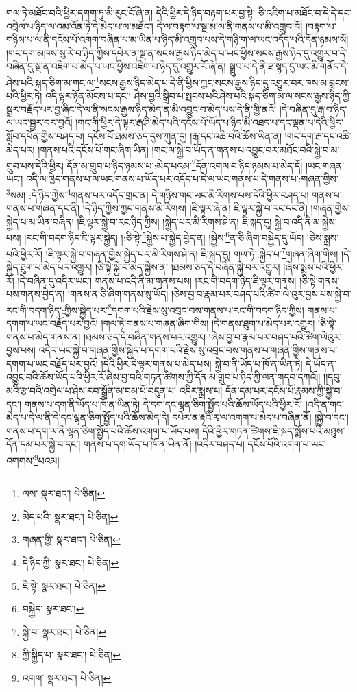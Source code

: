 གལ་ཏེ་མཐོང་བའི་ཕྱིར་དགག་ཏུ་མི་རུང་ངོ་ཞེ་ན། དེའི་ཕྱིར་དེ་ཉིད་བརྟག་པར་བྱ་སྟེ། ཅི་འཇིག་པ་མཐོང་བ་དེ་དེ་དང་འབྲེལ་པ་ཉིད་ལ་འམ་འོན་ཏེ་དེ་མེད་པ་ལ་མཐོང་། དེ་ལ་བརྟག་པ་སྔ་མ་ལ་ནི་གནས་པ་མི་འགྲུབ་བོ། །བརྟག་པ་གཉིས་པ་ལ་ནི་དངོས་པོ་འགག་བཞིན་པ་མ་ཡིན་པ་ཉིད་མི་འགྲུབ་པས་དེ་གཉི་ག་ལ་ཡང་འདོད་པའི་དོན་ཉམས་སོ། །གང་དག་མཁས་སུ་རེ་བ་ཉིད་ཀྱིས་དཔེར་ན་སྔ་ན་སངས་རྒྱས་ཉིད་མེད་པ་ཡང་ཕྱིས་སངས་རྒྱས་ཉིད་དུ་འགྱུར་བ་དེ་བཞིན་དུ་སྔ་ན་འཇིག་པ་མེད་པ་ཡང་ཕྱིས་འཇིག་པ་ཉིད་དུ་འགྱུར་རོ་ཞེ་ན། སྒྲུབ་པ་དེ་ནི་ཐ་སྙད་དུ་ཡང་མི་གནོད་དེ་ཤེས་པའི་སྐད་ཅིག་མ་གང་ལ་\footnote{ལས་  སྣར་ཐང་།  པེ་ཅིན། }སངས་རྒྱས་ཉིད་མེད་པ་དེ་ནི་ཕྱིས་ཀྱང་སངས་རྒྱས་ཉིད་དུ་འགྱུར་བར་ཁས་མ་བླངས་པའི་ཕྱིར་ཏེ། འདི་ལྟར་ཉོན་མོངས་པ་དང་། ཤེས་བྱའི་སྒྲིབ་པ་སྤངས་པའི་ཤེས་པའི་སྐད་ཅིག་མ་ལ་སངས་རྒྱས་ཉིད་ཀྱི་སྒྲར་བརྗོད་པར་བྱ་ཞིང་དེ་ལ་ནི་སངས་རྒྱས་ཉིད་མེད་ན་མི་འབྱུང་བ་མེད་པས་དེ་ནི་གྱི་ནའོ། །དེ་བཞིན་དུ་རྒ་བ་ཉིད་ལ་ཡང་སྦྱར་བར་བྱའོ། །གང་གི་ཕྱིར་དེ་ལྟར་རྒ་ཤི་མེད་པའི་དངོས་པོ་ཡོད་པ་ཉིད་མི་འཐད་པ་དང་ལྡན་པ་དེའི་ཕྱིར་སློབ་དཔོན་གྱིས་བཤད་པ། དངོས་པོ་ཐམས་ཅད་དུས་ཀུན་དུ། །རྒ་དང་འཆི་བའི་ཆོས་ཡིན་ན། །གང་དག་རྒ་དང་འཆི་མེད་པར། །གནས་པའི་དངོས་པོ་གང་ཞིག་ཡིན། །གང་ལ་སྐྱེ་བ་ཡོད་ན་གནས་པ་འབྱུང་བར་མཐོང་བའི་སྐྱེ་བ་མ་གྲུབ་པས་དེའི་ཕྱིར། དོན་མ་གྲུབ་པ་ཉིད་ཉམས་པ་:མེད་པའམ་\footnote{མེད་པའི་  སྣར་ཐང་།  པེ་ཅིན། }དོན་འགལ་བ་ཉིད་ཉམས་པ་མེད་དོ། །ཡང་གཞན་ཡང་། འདི་ལ་ཁྱེད་གནས་པ་ལ་ཡང་གནས་པ་ཡོད་པར་འདོད་པ་དེ་ལ་ཡང་གནས་པ་དེ་གནས་པ་:གཞན་གྱིས་\footnote{གཞན་གྱི་  སྣར་ཐང་།  པེ་ཅིན། }སམ། :དེ་ཉིད་ཀྱིས་\footnote{དེ་ཉིད་ཀྱི་  སྣར་ཐང་།  པེ་ཅིན། }གནས་པར་འདོད་གྲང་ན། དེ་གཉིས་གང་ཡང་མི་རིགས་པས་དེའི་ཕྱིར་བཤད་པ། གནས་པ་གནས་པ་གཞན་དང་ནི། །དེ་ཉིད་ཀྱིས་ཀྱང་གནས་མི་རིགས། །ཇི་ལྟར་ཞེ་ན། ཇི་ལྟར་སྐྱེ་བ་རང་དང་ནི། །གཞན་གྱིས་སྐྱེད་པ་མ་ཡིན་བཞིན། །ཇི་ལྟར་སྐྱེ་བ་རང་ཉིད་ཀྱིས། །སྐྱེད་པར་མི་རིགས་ཤེ་ན། ཇི་སྐད་དུ། སྐྱེ་བ་འདི་ནི་མ་སྐྱེས་པས། །རང་གི་བདག་ཉིད་ཇི་ལྟར་སྐྱེད། །:ཅི་སྟེ་\footnote{ཇི་སྟེ་  སྣར་ཐང་།  པེ་ཅིན། }སྐྱེས་པ་སྐྱེད་བྱེད་ན། །སྐྱེས་\footnote{བསྐྱེད་  སྣར་ཐང་། }ན་ཅི་ཞིག་བསྐྱེད་དུ་ཡོད། །ཅེས་སྨྲས་པའི་ཕྱིར་རོ། །ཇི་ལྟར་སྐྱེ་བ་གཞན་གྱིས་སྐྱེད་པར་མི་རིགས་ཤེ་ན། ཇི་སྐད་དུ། གལ་ཏེ་:སྐྱེད་པ་\footnote{སྐྱེ་བ་  སྣར་ཐང་།  པེ་ཅིན། }གཞན་ཞིག་གིས། །དེ་སྐྱེད་ཐུག་པ་མེད་པར་འགྱུར། །ཅི་སྟེ་སྐྱེ་བ་མེད་སྐྱེས་ན། །ཐམས་ཅད་དེ་བཞིན་སྐྱེ་བར་འགྱུར། །ཞེས་སྨྲས་པའི་ཕྱིར་རོ། །དེ་བཞིན་དུ་འདིར་ཡང་། གནས་པ་འདི་ནི་མ་གནས་པས། །རང་གི་བདག་ཉིད་ཇི་ལྟར་གནས། །ཅི་སྟེ་གནས་པས་གནས་བྱེད་ན། །གནས་ན་ཅི་ཞིག་གནས་སུ་ཡོད། །ཅེས་བྱ་བ་རྣམ་པར་བཤད་པའི་ཚིག་ལེ་འུར་བྱས་པས་སྐྱེ་བ་རང་གི་བདག་ཉིད་:ཀྱིས་སྐྱེད་པར་\footnote{ཀྱི་སྐྱིད་པ་  སྣར་ཐང་།  པེ་ཅིན། }དགག་པའི་རྗེས་སུ་འབྲང་བས་གནས་པ་རང་གི་བདག་ཉིད་ཀྱིས། གནས་པ་དགག་པ་ཡང་བརྗོད་པར་བྱའོ། །གལ་ཏེ་གནས་པ་གཞན་ཞིག་གིས། །དེ་གནས་ཐུག་པ་མེད་པར་འགྱུར། །ཅི་སྟེ་གནས་པ་མེད་གནས་ན། །ཐམས་ཅད་དེ་བཞིན་གནས་པར་འགྱུར། །ཞེས་བྱ་བ་རྣམ་པར་བཤད་པའི་ཚིག་ལེའུར་བྱས་པས། འདིར་ཡང་སྐྱེ་བ་གཞན་གྱིས་སྐྱེད་པ་དགག་པའི་རྗེས་སུ་འབྲང་བས་གནས་པ་གཞན་གྱིས་གནས་པ་དགག་པ་ཡང་བརྗོད་པར་བྱའོ། །དེའི་ཕྱིར་དེ་ལྟར་གནས་པ་མེད་པས། སྐྱེ་བ་ནི་ཡོད་པ་ཁོ་ན་ཡིན་ཏེ། དེ་ཡོད་ན་འབྱུང་བའི་ཆོས་ཡོད་པའི་ཕྱིར་རོ་ཞེས་བྱ་བའི་གཏན་ཚིགས་ཀྱི་དོན་མ་གྲུབ་པ་ཉིད་ཀྱི་ལན་གདབ་དཀའོ།། །།དབུ་མའི་རྩ་བའི་འགྲེལ་པ་ཤེས་རབ་སྒྲོན་མ་བམ་པོ་བདུན་པ། འདིར་སྨྲས་པ། དོན་དམ་པར་དངོས་པོ་རྣམས་ཀྱི་སྐྱེ་བ་དང་། གནས་པ་དག་ནི་ཡོད་པ་ཁོ་ན་ཡིན་ཏེ། དེ་དག་དང་ལྷན་ཅིག་སྤྱོད་པའི་ཆོས་ཡོད་པའི་ཕྱིར་རོ། །འདི་ན་གང་མེད་པ་དེ་ལ་ནི་དེ་དང་ལྷན་ཅིག་སྤྱོད་པའི་ཆོས་མེད་དེ། དཔེར་ན་རྟའི་རྭ་ལ་འགག་པ་མེད་པ་བཞིན་ནོ། །སྐྱེ་བ་དང་། གནས་པ་དག་ལ་ནི་ལྷན་ཅིག་སྤྱོད་པའི་ཆོས་འགག་པ་ཡོད་པས། དེའི་ཕྱིར་གཏན་ཚིགས་ཇི་སྐད་སྨོས་པའི་མཐུས་དོན་དམ་པར་སྐྱེ་བ་དང་། གནས་པ་དག་ཡོད་པ་ཁོ་ན་ཡིན་ནོ། །འདིར་བཤད་པ། དངོས་པོའི་འགག་པ་ཡང་འགགས་\footnote{འགག་  སྣར་ཐང་།  པེ་ཅིན། }པའམ། 